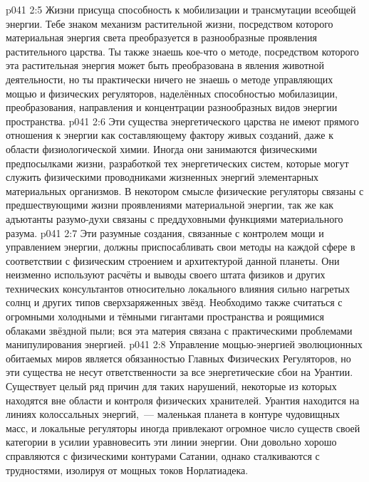 \vs p041 2:5 Жизни присуща способность к мобилизации и трансмутации всеобщей энергии. Тебе знаком механизм растительной жизни, посредством которого материальная энергия света преобразуется в разнообразные проявления растительного царства. Ты также знаешь кое-что о методе, посредством которого эта растительная энергия может быть преобразована в явления животной деятельности, но ты практически ничего не знаешь о методе управляющих мощью и физических регуляторов, наделённых способностью мобилазиции, преобразования, направления и концентрации разнообразных видов энергии пространства.
\vs p041 2:6 \pc Эти существа энергетического царства не имеют прямого отношения к энергии как составляющему фактору живых созданий, даже к области физиологической химии. Иногда они занимаются физическими предпосылками жизни, разработкой тех энергетических систем, которые могут служить физическими проводниками жизненных энергий элементарных материальных организмов. В некотором смысле физические регуляторы связаны с предшествующими жизни проявлениями материальной энергии, так же как адъютанты разумо\hyp{}духи связаны с преддуховными функциями материального разума.
\vs p041 2:7 \pc Эти разумные создания, связанные с контролем мощи и управлением энергии, должны приспосабливать свои методы на каждой сфере в соответствии с физическим строением и архитектурой данной планеты. Они неизменно используют расчёты и выводы своего штата физиков и других технических консультантов относительно локального влияния сильно нагретых солнц и других типов сверхзаряженных звёзд. Необходимо также считаться с огромными холодными и тёмными гигантами пространства и роящимися облаками звёздной пыли; вся эта материя связана с практическими проблемами манипулирования энергией.
\vs p041 2:8 Управление мощью\hyp{}энергией эволюционных обитаемых миров является обязанностью Главных Физических Регуляторов, но эти существа не несут ответственности за все энергетические сбои на Урантии. Существует целый ряд причин для таких нарушений, некоторые из которых находятся вне области и контроля физических хранителей. Урантия находится на линиях колоссальных энергий,~--- маленькая планета в контуре чудовищных масс, и локальные регуляторы иногда привлекают огромное число существ своей категории в усилии уравновесить эти линии энергии. Они довольно хорошо справляются с физическими контурами Сатании, однако сталкиваются с трудностями, изолируя от мощных токов Норлатиадека.
